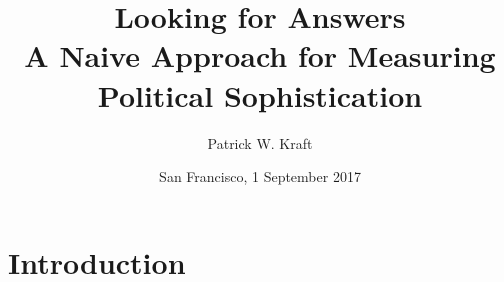 \documentclass{beamer}
\author{Patrick W. Kraft}
\institute{113\textsuperscript{th} APSA Annual Meeting}
\title{Looking for Answers\\{\large A Naive Approach for Measuring Political Sophistication}}
\date{San Francisco, 1 September 2017}
\begin{document}
\frame{\titlepage}


\section{Introduction}
\end{document}
